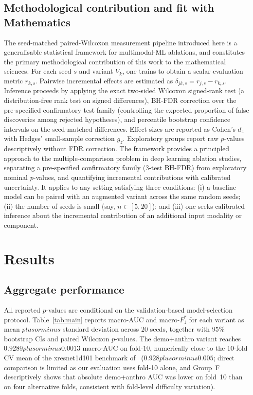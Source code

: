 \documentclass[mathematics,article,submit,pdftex]{Definitions/mdpi}
\def\texttt#1{#1}%
\def\mathrm#1{#1}%
\def\pm{plus or minus }%
\begin{document}
\subsection{Methodological contribution and fit with Mathematics}
The seed-matched paired-Wilcoxon measurement pipeline introduced here is a generalisable statistical framework for multimodal-ML ablations, and constitutes the primary methodological contribution of this work to the mathematical sciences. For each seed $s$ and variant $V_k$, one trains to obtain a scalar evaluation metric $r_{k,s}$. Pairwise incremental effects are estimated as $\delta_{jk,s} = r_{j,s} - r_{k,s}$. Inference proceeds by applying the exact two-sided Wilcoxon signed-rank test (a distribution-free rank test on signed differences), BH-FDR correction over the pre-specified confirmatory test family (controlling the expected proportion of false discoveries among rejected hypotheses), and percentile bootstrap confidence intervals on the seed-matched differences. Effect sizes are reported as Cohen's $d_{\mathrm{z}}$ with Hedges' small-sample correction $g_{\mathrm{z}}$. Exploratory groups report raw $p$-values descriptively without FDR correction. The framework provides a principled approach to the multiple-comparison problem in deep learning ablation studies, separating a pre-specified confirmatory family (3-test BH-FDR) from exploratory nominal $p$-values, and quantifying incremental contributions with calibrated uncertainty. It applies to any setting satisfying three conditions: (i) a baseline model can be paired with an augmented variant across the same random seeds; (ii) the number of seeds is small (say, $n \in [5, 20]$); and (iii) one seeks calibrated inference about the incremental contribution of an additional input modality or component.

\section{Results}\label{sec:results}

\subsection{Aggregate performance}
All reported $p$-values are conditional on the validation-based model-selection protocol.
Table~\ref{tab:main} reports macro-AUC and macro-$F_1^{\ast}$ for each variant as mean $\pm$ standard deviation across 20 seeds, together with 95\% bootstrap CIs and paired Wilcoxon $p$-values. The \texttt{demo+anthro} variant reaches $0.9289 \pm 0.0013$ macro-AUC on fold-10, numerically close to the 10-fold CV mean of the xresnet1d101 benchmark of~\cite{Strodthoff2021} ($0.928 \pm 0.005$; direct comparison is limited as our evaluation uses fold-10 alone, and Group~F descriptively shows that absolute demo+anthro AUC was lower on fold~10 than on four alternative folds, consistent with fold-level difficulty variation).
\end{document}
